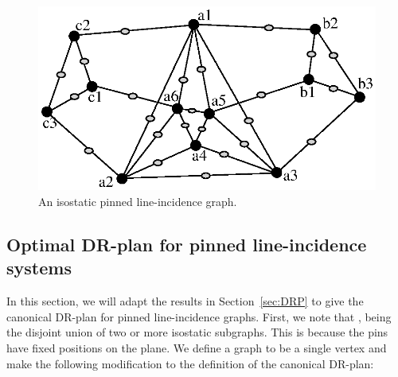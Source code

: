\begin{figure}\centering
    \includegraphics[width=.7\linewidth]{img/pinned}
    \caption{An isostatic pinned line-incidence graph.}
    \label{fig:pinned_line}
\end{figure}


\subsection{Optimal DR-plan for pinned line-incidence systems}


In this section, we will adapt the results in Section~\ref{sec:DRP} to give the canonical DR-plan for pinned line-incidence graphs. First, we note that
, being the disjoint union of two or more isostatic subgraphs. This is because the pins have fixed positions on the plane.
%
%
%
%
%
%
%
We define a  graph to be a single vertex and make the following modification to the definition of the canonical DR-plan:

